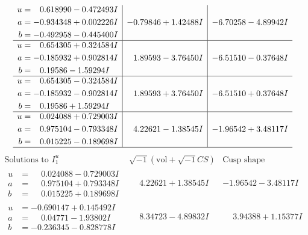 \documentclass[1p]{elsarticle_modified}
\theoremstyle{definition}
\newcommand{\I}{\sqrt{-1}}
\begin{document}
$$\begin{array}{c|c|c}
\begin{aligned}
u &= \phantom{-}0.618990 - 0.472493 I \\
a &= -0.934348 + 0.002226 I \\
b &= -0.492958 - 0.445400 I\end{aligned}
 & -0.79846 + 1.42488 I & -6.70258 - 4.89942 I \\ \hline\begin{aligned}
u &= \phantom{-}0.654305 + 0.324584 I \\
a &= -0.185932 + 0.902814 I \\
b &= \phantom{-}0.19586 - 1.59294 I\end{aligned}
 & \phantom{-}1.89593 - 3.76450 I & -6.51510 - 0.37648 I \\ \hline\begin{aligned}
u &= \phantom{-}0.654305 - 0.324584 I \\
a &= -0.185932 - 0.902814 I \\
b &= \phantom{-}0.19586 + 1.59294 I\end{aligned}
 & \phantom{-}1.89593 + 3.76450 I & -6.51510 + 0.37648 I \\ \hline\begin{aligned}
u &= \phantom{-}0.024088 + 0.729003 I \\
a &= \phantom{-}0.975104 - 0.793348 I \\
b &= \phantom{-}0.015225 - 0.189698 I\end{aligned}
 & \phantom{-}4.22621 - 1.38545 I & -1.96542 + 3.48117 I\\
 \hline 
 \end{array}$$\newpage$$\begin{array}{c|c|c}  
\text{Solutions to }I^u_{1}& \I (\text{vol} + \sqrt{-1}CS) & \text{Cusp shape}\\
 \hline 
\begin{aligned}
u &= \phantom{-}0.024088 - 0.729003 I \\
a &= \phantom{-}0.975104 + 0.793348 I \\
b &= \phantom{-}0.015225 + 0.189698 I\end{aligned}
 & \phantom{-}4.22621 + 1.38545 I & -1.96542 - 3.48117 I \\ \hline\begin{aligned}
u &= -0.690147 + 0.145492 I \\
a &= \phantom{-}0.04771 - 1.93802 I \\
b &= -0.236345 - 0.828778 I\end{aligned}
 & \phantom{-}8.34723 - 4.89832 I & \phantom{-}3.94388 + 1.15377 I \\ \hline\begin{aligned}

\end{aligned}
\end{array}$$
\end{document}
